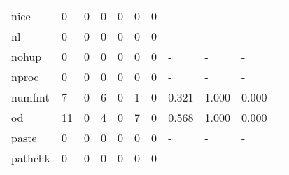 \begin{longtable}{lp{1.10cm}p{1.10cm}p{1.10cm}p{1.10cm}p{1.10cm}p{1.10cm}p{1.10cm}p{1.10cm}p{1.10cm}p{1.10cm}}
nice      &                      0 &                                  0 &                                 0 &                                0 &                                 0 &                               0 &                              - &                                     - &                                   - \\
nl        &                      0 &                                  0 &                                 0 &                                0 &                                 0 &                               0 &                              - &                                     - &                                   - \\
nohup     &                      0 &                                  0 &                                 0 &                                0 &                                 0 &                               0 &                              - &                                     - &                                   - \\
nproc     &                      0 &                                  0 &                                 0 &                                0 &                                 0 &                               0 &                              - &                                     - &                                   - \\
numfmt    &                      7 &                                  0 &                                 6 &                                0 &                                 1 &                               0 &                          0.321 &                                 1.000 &                               0.000 \\
od        &                     11 &                                  0 &                                 4 &                                0 &                                 7 &                               0 &                          0.568 &                                 1.000 &                               0.000 \\
paste     &                      0 &                                  0 &                                 0 &                                0 &                                 0 &                               0 &                              - &                                     - &                                   - \\
pathchk   &                      0 &                                  0 &                                 0 &                                0 &                                 0 &                               0 &                              - &                                     - &                                   - \\

\end{longtable}
